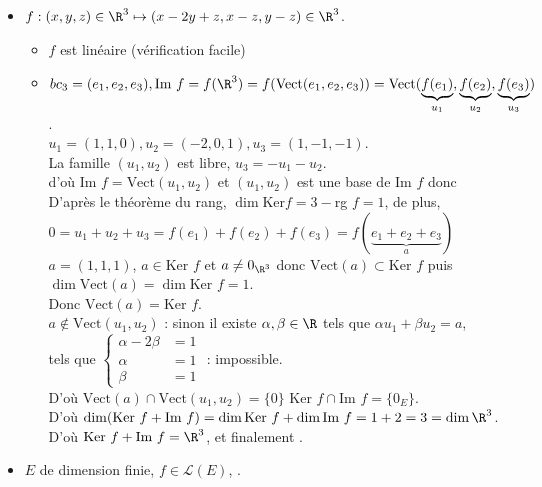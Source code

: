 \documentclass[12pt, a4paper]{report}
\begin{document}
\begin{exemple}{}
\begin{itemize}
	\item $f : (x,y,z) \in \R^3 \mapsto (x-2y+z,x-z,y-z) \in \R^3$. \\
	\begin{itemize}
		\item $f$ est linéaire (vérification facile)
		\item $bc_3 = (e_1,e_2,e_3), \text{Im }f = f(\R^3) = f(\text{Vect}(e_1,e_2,e_3)) = \text{Vect}(\underbrace{f(e_1)}_{u_1},\underbrace{f(e_2)}_{u_2},\underbrace{f(e_3)}_{u_3})$. \\
		$u_1 = (1,1,0), u_2 = (-2,0,1), u_3 = (1,-1,-1)$. \\
		La famille $(u_1,u_2)$ est libre, $u_3 = -u_1-u_2$. \\
		d'où $\text{Im }f = \text{Vect}(u_1,u_2)$ et $(u_1,u_2)$ est une base de $\text{Im }f$ donc  \\
		
		D'après le théorème du rang, $\dim \text{Ker} f = 3-$rg $f = 1$, de plus, \\
		$0 = u_1+u_2+u_3 = f(e_1)+f(e_2)+f(e_3) = f(\underbrace{e_1+e_2+e_3}_{a})$ \\
		$a = (1,1,1)$, $a \in \text{Ker }f$ et $a \ne 0_{\R^3}$ donc $\text{Vect}(a) \subset \text{Ker }f$ puis $\dim \text{Vect}(a) = \dim \text{Ker }f = 1$. \\
		Donc $\text{Vect}(a) = \text{Ker }f$. \\
		
		$a \not \in \text{Vect}(u_1,u_2)$ : sinon il existe $\alpha,\beta \in \R$ tels que $\alpha u_1+\beta u_2 = a$, \\
		\ie tels que $\begin{cases} \alpha-2\beta &= 1 \\ \alpha &= 1 \\ \beta &= 1 \end{cases}$ : impossible. \\
		
		D'où $\text{Vect}(a) \cap \text{Vect}(u_1,u_2) = \{0\}$ \ie $\text{Ker }f \cap \text{Im }f = \{0_E\}$. \\
		D'où $\dim (\text{Ker }f+\text{Im }f) = \dim \text{Ker } f + \dim \text{Im }f = 1+2 = 3 = \dim \R^3$. \\
		D'où $\text{Ker }f + \text{Im }f = \R^3$, et finalement .
		
	\end{itemize}
	
	\item $E$ de dimension finie, $f \in \mathcal{L}(E)$, . 
\end{itemize}
\end{exemple}
\end{document}
